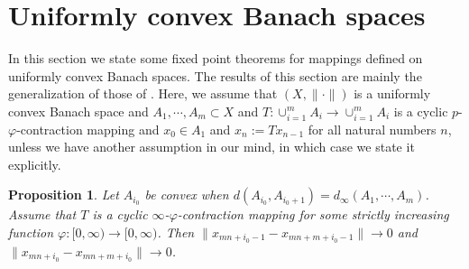 \documentclass{amsart}
\newtheorem{proposition}[theorem]{Proposition}
\theoremstyle{definition}
\theoremstyle{remark}
\begin{document}
\section{Uniformly convex Banach spaces}
In this section we state some fixed point theorems for mappings defined on uniformly convex Banach spaces. The results of this section are mainly the generalization of those of \cite[Section 2]{ThSh}. Here, we assume that $(X,\|\cdot\|)$ is a uniformly convex Banach space and $A_1,\cdots,A_m\subset X$ and $T:\cup_{i=1}^mA_i\to\cup_{i=1}^mA_i$ is a cyclic $p$-$\varphi$-contraction mapping and $x_0\in A_1$ and $x_n:=Tx_{n-1}$ for all natural numbers $n$,
unless we have another assumption in our mind, in which case we state it explicitly.
\begin{proposition}\label{VV}Let $A_{i_0}$ be convex when $d(A_{i_0},A_{i_0+1})=d_\infty(A_1,\cdots,A_m)$. Assume that $T$ is a cyclic $\infty$-$\varphi$-contraction mapping for some strictly increasing function $\varphi:[0,\infty)\to[0,\infty)$. Then $\|x_{mn+i_0-1}-x_{mn+m+i_0-1}\|\to0$ and $\|x_{mn+i_0}-x_{mn+m+i_0}\|\to0$.
\end{proposition}
\end{document}
